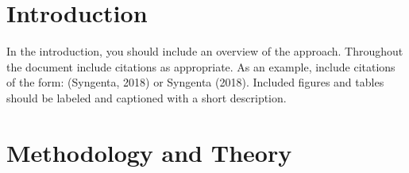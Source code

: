 \documentclass[syngen,nonblindrev]{informs3-syngen}
\begin{document}
%


\section{Introduction}

In the introduction, you should include an overview of the approach. Throughout the document include citations as appropriate. As an example, include citations of the form: (Syngenta, 2018) or Syngenta (2018). Included figures and tables should be labeled and captioned with a short description.


\section{Methodology and Theory}
\end{document}
